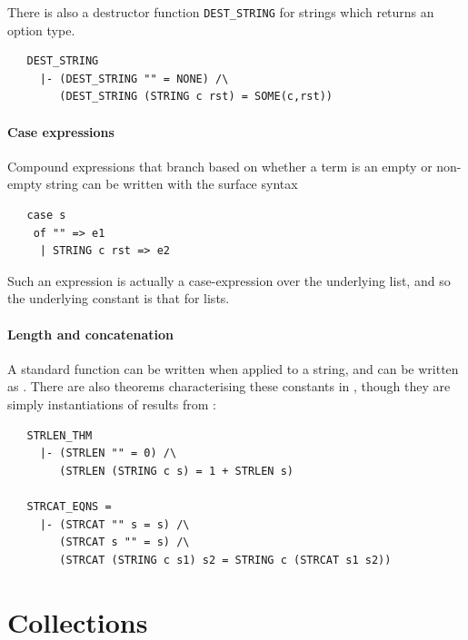 {There is also a destructor function {\small\verb+DEST_STRING+} for
strings which returns an option type.
\begin{hol}
\begin{verbatim}
   DEST_STRING
     |- (DEST_STRING "" = NONE) /\
        (DEST_STRING (STRING c rst) = SOME(c,rst))
\end{verbatim}
\end{hol}


\paragraph{Case expressions}

Compound \HOL{} expressions that branch based on
whether a term is an empty or non-empty string can be written with the
surface syntax
\begin{hol}
\begin{verbatim}
   case s
    of "" => e1
     | STRING c rst => e2
\end{verbatim}
\end{hol}

Such an expression is actually a case-expression over the underlying list, and so the underlying constant is that for lists.

\paragraph {Length and concatenation}

A standard function  can be written 
when applied to a string, and \holtxt{APPEND} can be written as
.  There are also theorems characterising these
constants in , though they are simply instantiations
of results from \ml{listTheory}:
\begin{hol}
\begin{verbatim}
   STRLEN_THM
     |- (STRLEN "" = 0) /\
        (STRLEN (STRING c s) = 1 + STRLEN s)

   STRCAT_EQNS =
     |- (STRCAT "" s = s) /\
        (STRCAT s "" = s) /\
        (STRCAT (STRING c s1) s2 = STRING c (STRCAT s1 s2))
\end{verbatim}
\end{hol}



\section{Collections}

}
